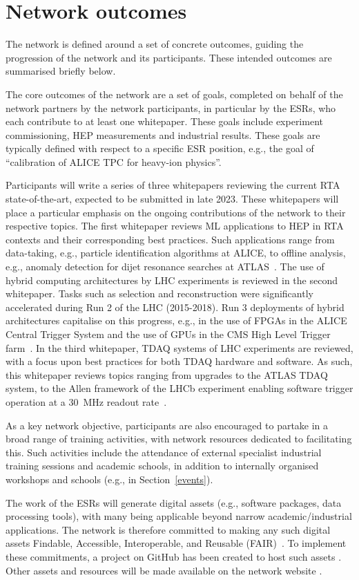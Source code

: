 \section{Network outcomes}
\label{outcomes}
The network is defined around a set of concrete outcomes, guiding the progression of the network and its participants. These intended outcomes are summarised briefly below.

The core outcomes of the network are a set of goals, completed on behalf of the network partners by the network participants, in particular by the ESRs, who each contribute to at least one whitepaper.  These goals include experiment commissioning, HEP measurements and industrial results. These goals are typically defined with respect to a specific ESR position, e.g., the goal of ``calibration of ALICE TPC for heavy-ion physics''.

Participants will write a series of three whitepapers reviewing the current RTA state-of-the-art, expected to be submitted in late 2023. These whitepapers will place a particular emphasis on the ongoing contributions of the network to their respective topics. The first whitepaper reviews ML applications to HEP in RTA contexts and their corresponding best practices. Such applications range from data-taking, e.g., particle identification algorithms at ALICE, to offline analysis, e.g., anomaly detection for dijet resonance searches at ATLAS~\cite{ALICE-PID, ATLAS-dijet}. The use of hybrid computing architectures by LHC experiments is reviewed in the second whitepaper. Tasks such as selection and reconstruction were significantly accelerated during Run 2 of the LHC (2015-2018). Run 3 deployments of hybrid architectures capitalise on this progress, e.g., in the use of FPGAs in the ALICE Central Trigger System and the use of GPUs in the CMS High Level Trigger farm~\cite{ALICE-CTS, CMS-HLT-farm}. In the third whitepaper, TDAQ systems of LHC experiments are reviewed, with a focus upon best practices for both TDAQ hardware and software. As such, this whitepaper reviews topics ranging from upgrades to the ATLAS TDAQ system, to the Allen framework of the LHCb experiment enabling software trigger operation at a 30~MHz readout rate~\cite{ATLAS-TDAQ, LHCb-Allen}.

As a key network objective, participants are also encouraged to partake in a broad range of training activities, with network resources dedicated to facilitating this. Such activities include the attendance of external specialist industrial training sessions and academic schools, in addition to internally organised workshops and schools (e.g., in Section~\ref{events}).

The work of the ESRs will generate digital assets (e.g., software packages, data processing tools), with many being applicable beyond narrow academic/industrial applications. The network is therefore committed to making any such digital assets Findable, Accessible, Interoperable, and Reusable (FAIR)~\cite{FAIR-principles}. To implement these commitments, a project on GitHub has been created to host such assets \cite{SMARTHEP-github}. Other assets and resources will be made available on the network website \cite{SMARTHEP-website}.